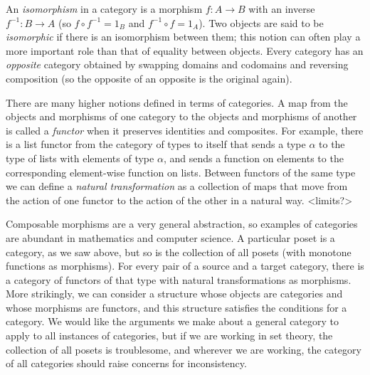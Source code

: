 \documentclass[twoside,titlepage,11pt]{article}
\begin{document}
An \emph{isomorphism} in a category is a morphism $f:A\to B$ with an inverse $f^{-1}:B\to A$ (so $f\circ f^{-1}=1_B$ and $f^{-1}\circ f=1_A$).
Two objects are said to be \emph{isomorphic} if there is an isomorphism between them; this notion can often play a more important role than that of equality between objects.
Every category has an \emph{opposite} category obtained by swapping domains and codomains and reversing composition (so the opposite of an opposite is the original again).

There are many higher notions defined in terms of categories.
A map from the objects and morphisms of one category to the objects and morphisms of another is called a \emph{functor} when it preserves identities and composites.
For example, there is a list functor from the category of types to itself that sends a type $\alpha$ to the type of lists with elements of type $\alpha$, and sends a function on elements to the corresponding element-wise function on lists.
Between functors of the same type we can define a \emph{natural transformation} as a collection of maps that move from the action of one functor to the action of the other in a natural way.
<limits?>

Composable morphisms are a very general abstraction, so examples of categories are abundant in mathematics and computer science.
A particular poset is a category, as we saw above, but so is the collection of all posets (with monotone functions as morphisms).
For every pair of a source and a target category, there is a category of functors of that type with natural transformations as morphisms.
More strikingly, we can consider a structure whose objects are categories and whose morphisms are functors, and this structure satisfies the conditions for a category.
We would like the arguments we make about a general category to apply to all instances of categories, but if we are working in set theory, the collection of all posets is troublesome, and wherever we are working, the category of all categories should raise concerns for inconsistency.%
\end{document}
